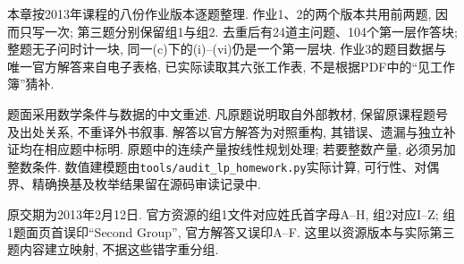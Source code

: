 \label{ass:15053-homework}
本章按2013年课程的八份作业版本逐题整理. 作业1、2的两个版本共用前两题, 因而只写一次; 第三题分别保留组1与组2. 去重后有24道主问题、104个第一层作答块; 整题无子问时计一块, 同一(c)下的(i)--(vi)仍是一个第一层块. 作业3的题目数据与唯一官方解答来自电子表格, 已实际读取其六张工作表, 不是根据PDF中的“见工作簿”猜补.

题面采用数学条件与数据的中文重述. 凡原题说明取自外部教材, 保留原课程题号及出处关系, 不重译外书叙事. 解答以官方解答为对照重构, 其错误、遗漏与独立补证均在相应题中标明. 原题中的连续产量按线性规划处理; 若要整数产量, 必须另加整数条件. 数值建模题由\texttt{tools/audit\_lp\_homework.py}实际计算, 可行性、对偶界、精确换基及枚举结果留在源码审读记录中.

原交期为2013年2月12日. 官方资源的组1文件对应姓氏首字母A--H, 组2对应I--Z; 组1题面页首误印“Second Group”, 官方解答又误印A--F. 这里以资源版本与实际第三题内容建立映射, 不据这些错字重分组.

